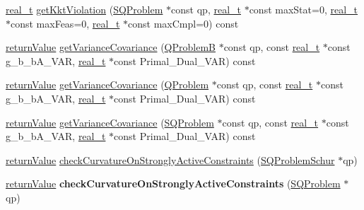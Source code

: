 \begin{DoxyCompactItemize}
\item 
\hyperlink{qp_o_a_s_e_s__wrapper_8h_a0d00e2b3dfadee81331bbb39068570c4}{real\+\_\+t} \hyperlink{class_solution_analysis_a2a92a378f1dc51d89db45236e88ca6af}{get\+Kkt\+Violation} (\hyperlink{class_s_q_problem}{S\+Q\+Problem} $\ast$const qp, \hyperlink{qp_o_a_s_e_s__wrapper_8h_a0d00e2b3dfadee81331bbb39068570c4}{real\+\_\+t} $\ast$const max\+Stat=0, \hyperlink{qp_o_a_s_e_s__wrapper_8h_a0d00e2b3dfadee81331bbb39068570c4}{real\+\_\+t} $\ast$const max\+Feas=0, \hyperlink{qp_o_a_s_e_s__wrapper_8h_a0d00e2b3dfadee81331bbb39068570c4}{real\+\_\+t} $\ast$const max\+Cmpl=0) const
\item 
\hyperlink{_message_handling_8hpp_a81d556f613bfbabd0b1f9488c0fa865e}{return\+Value} \hyperlink{class_solution_analysis_a4ecd8d465dc457d0cce6353fb54df797}{get\+Variance\+Covariance} (\hyperlink{class_q_problem_b}{Q\+ProblemB} $\ast$const qp, const \hyperlink{qp_o_a_s_e_s__wrapper_8h_a0d00e2b3dfadee81331bbb39068570c4}{real\+\_\+t} $\ast$const g\+\_\+b\+\_\+b\+A\+\_\+\+V\+AR, \hyperlink{qp_o_a_s_e_s__wrapper_8h_a0d00e2b3dfadee81331bbb39068570c4}{real\+\_\+t} $\ast$const Primal\+\_\+\+Dual\+\_\+\+V\+AR) const
\item 
\hyperlink{_message_handling_8hpp_a81d556f613bfbabd0b1f9488c0fa865e}{return\+Value} \hyperlink{class_solution_analysis_a37a146a9e6c1ba38089527c9bb734cdc}{get\+Variance\+Covariance} (\hyperlink{class_q_problem}{Q\+Problem} $\ast$const qp, const \hyperlink{qp_o_a_s_e_s__wrapper_8h_a0d00e2b3dfadee81331bbb39068570c4}{real\+\_\+t} $\ast$const g\+\_\+b\+\_\+b\+A\+\_\+\+V\+AR, \hyperlink{qp_o_a_s_e_s__wrapper_8h_a0d00e2b3dfadee81331bbb39068570c4}{real\+\_\+t} $\ast$const Primal\+\_\+\+Dual\+\_\+\+V\+AR) const
\item 
\hyperlink{_message_handling_8hpp_a81d556f613bfbabd0b1f9488c0fa865e}{return\+Value} \hyperlink{class_solution_analysis_a360b193c55944cff1ae2365252a2a645}{get\+Variance\+Covariance} (\hyperlink{class_s_q_problem}{S\+Q\+Problem} $\ast$const qp, const \hyperlink{qp_o_a_s_e_s__wrapper_8h_a0d00e2b3dfadee81331bbb39068570c4}{real\+\_\+t} $\ast$const g\+\_\+b\+\_\+b\+A\+\_\+\+V\+AR, \hyperlink{qp_o_a_s_e_s__wrapper_8h_a0d00e2b3dfadee81331bbb39068570c4}{real\+\_\+t} $\ast$const Primal\+\_\+\+Dual\+\_\+\+V\+AR) const
\item 
\hyperlink{_message_handling_8hpp_a81d556f613bfbabd0b1f9488c0fa865e}{return\+Value} \hyperlink{class_solution_analysis_aedeafda08098143bb699bdba599dc94f}{check\+Curvature\+On\+Strongly\+Active\+Constraints} (\hyperlink{class_s_q_problem_schur}{S\+Q\+Problem\+Schur} $\ast$qp)
\item 
\mbox{\label{class_solution_analysis_ae08773c508adc8468f31f8c40b320fd7}} 
\hyperlink{_message_handling_8hpp_a81d556f613bfbabd0b1f9488c0fa865e}{return\+Value} {\bfseries check\+Curvature\+On\+Strongly\+Active\+Constraints} (\hyperlink{class_s_q_problem}{S\+Q\+Problem} $\ast$qp)
\end{DoxyCompactItemize}


